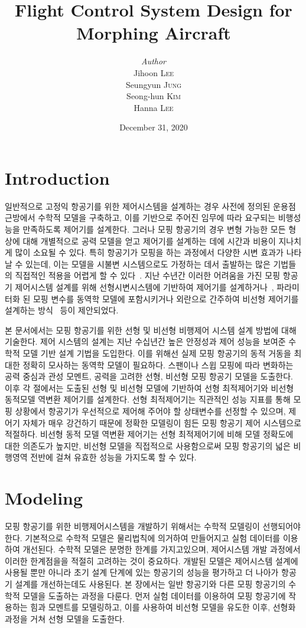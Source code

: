 \documentclass[a4paper, 12pt]{report}
\institute{Seoul National University}
\title{Flight Control System Design for Morphing Aircraft}
\author{\textit{Author}\\Jihoon \textsc{Lee}\\Seungyun \textsc{Jung}\\Seong-hun \textsc{Kim}\\Hanna \textsc{Lee}}
\date{December 31, 2020}
\begin{document}
	\maketitle
	\romantableofcontents

	\chapter{Introduction}
	일반적으로 고정익 항공기를 위한 제어시스템을 설계하는 경우 사전에 정의된 운용점 근방에서 수학적 모델을 구축하고, 이를 기반으로 주어진 임무에 따라 요구되는 비행성능을 만족하도록 제어기를 설계한다.
	그러나 모핑 항공기의 경우 변형 가능한 모든 형상에 대해 개별적으로 공력 모델을 얻고 제어기를 설계하는 데에 시간과 비용이 지나치게 많이 소요될 수 있다.
	특히 항공기가 모핑을 하는 과정에서 다양한 시변 효과가 나타날 수 있는데, 이는 모델을 시불변 시스템으로도 가정하는 데서 출발하는 많은 기법들의 직접적인 적용을 어렵게 할 수 있다~\cite{seigler_analysis_2009,chakravarthy_time-varying_2012}.
	지난 수년간 이러한 어려움을 가진 모핑 항공기 제어시스템 설계를 위해  선형시변시스템에 기반하여 제어기를 설계하거나~\cite{jiang_systematic_2015,lee_linear_2019}, 파라미터화 된 모핑 변수를 동역학 모델에 포함시키거나 외란으로 간주하여 비선형 제어기를 설계하는 방식~\cite{wu_modified_2017,lee_neural_2019,jung_disturbance_2020} 등이 제안되었다.

	본 문서에서는 모핑 항공기를 위한 선형 및 비선형 비행제어 시스템 설계 방법에 대해 기술한다.
	제어 시스템의 설계는 지난 수십년간 높은 안정성과 제어 성능을 보여준 수학적 모델 기반 설계 기법을 도입한다.
	이를 위해선 실제 모핑 항공기의 동적 거동을 최대한 정확히 모사하는 동역학 모델이 필요하다.
	스팬이나 스윕 모핑에 따라 변화하는 공력 중심과 관성 모멘트, 공력을 고려한 선형, 비선형 모핑 항공기 모델을 도출한다.
	이후 각 절에서는 도출된 선형 및 비선형 모델에 기반하여 선형 최적제어기와 비선형 동적모델 역변환 제어기를 설계한다.
	선형 최적제어기는 직관적인 성능 지표를 통해 모핑 상황에서 항공기가 우선적으로 제어해 주어야 할 상태변수를 선정할 수 있으며, 제어기 자체가 매우 강건하기 때문에 정확한 모델링이 힘든 모핑 항공기 제어 시스템으로 적절하다.
	비선형 동적 모델 역변환 제어기는 선형 최적제어기에 비해 모델 정확도에 대한 의존도가 높지만, 비선형 모델을 직접적으로 사용함으로써 모핑 항공기의 넓은 비행영역 전반에 걸쳐 유효한 성능을 가지도록 할 수 있다.

	\chapter{Modeling}

	모핑 항공기를 위한 비행제어시스템을 개발하기 위해서는 수학적 모델링이 선행되어야 한다. 
	기본적으로 수학적 모델은 물리법칙에 의거하여 만들어지고 실험 데이터를 이용하여 개선된다. 
	수학적 모델은 분명한 한계를 가지고있으며, 제어시스템 개발 과정에서 이러한 한계점을을 적절히 고려하는 것이 중요하다.
	개발된 모델은 제어시스템 설계에 사용될 뿐만 아니라 초기 설계 단계에 있는 항공기의 성능을 평가하고 더 나아가 항공기 설계를 개선하는데도 사용된다.
	본 장에서는 일반 항공기와 다른 모핑 항공기의 수학적 모델을 도출하는 과정을 다룬다.
	먼저 실험 데이터를 이용하여 모핑 항공기에 작용하는 힘과 모멘트를 모델링하고, 이를 사용하여 비선형 모델을 유도한 이후, 선형화 과정을 거쳐 선형 모델을 도출한다.
	
\end{document}
